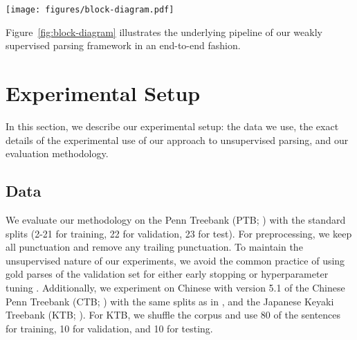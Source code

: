 \documentclass[11pt]{article}
\newcommand{\ptb}{\textsc{PTB}}
\newcommand{\ctb}{\textsc{CTB}}
\newcommand{\ktb}{\textsc{KTB}}
\begin{document}
\begin{figure*}[t]
    \centering
     \texttt{[image: figures/block-diagram.pdf]}
    \caption[Block diagram detailing our approach]{Block diagram detailing our approach. We perform the self-training procedure for five iterations which follow multiple steps; \textbf{(I)}: Fine-tune a RoBERTa\textsubscript{\textsc{Base}} model (teacher) on a downstream task using a cross-entropy loss after seed bootstrapping; \textbf{(II)}: Synthetically annotate this data using the teacher model and select top K samples corresponding to each class to form the final synthetic dataset; We fine-tune a RoBERTa\textsubscript{\textsc{Base}} model (student) on this dataset using hard labels and retrieve the outside strings from the most confident insides; \textbf{(III)}: Train the outside classifier on these outside strings;  We perform the co-training procedure for two iterations which follow a two-fold optimizing step; \textbf{(IV)}: Retrieve the inside strings from the most confident outsides and train the inside classifier; \textbf{(V)}: Retrieve the outside strings from the most confident insides and train the outside classifier.}
    \label{fig:block-diagram}
\end{figure*}


Figure~\ref{fig:block-diagram} illustrates the underlying pipeline of our weakly supervised parsing framework in an end-to-end fashion.
 \section{Experimental Setup}
\label{sec:experiments}

In this section, we describe our experimental setup: the data we use, the exact details of the experimental use of our approach to unsupervised parsing, and our evaluation methodology.

\subsection{Data}
\label{ssec:data}
We evaluate our methodology on the Penn Treebank (\ptb{}; \citealt{marcus-etal-1993-building}) with the standard splits (2-21 for training, 22 for validation, 23 for test). For preprocessing, we keep all punctuation and remove any trailing punctuation. To maintain the unsupervised nature of our experiments, we avoid the common practice of using gold parses of the validation set for either early stopping \citep{shen2018neural, shen2018ordered, drozdov-etal-2019-unsupervised} or hyperparameter tuning \citep{kim-etal-2019-compound}. Additionally, we experiment on Chinese with version 5.1 of the Chinese Penn Treebank (\ctb{}; \citealt{DBLP:journals/nle/XueXCP05}) with the same splits as in \citet{chen-manning-2014-fast}, and the Japanese Keyaki Treebank (\ktb{}; \citealt{butlerkeyaki}). For \ktb, we shuffle the corpus and use 80 of the sentences for training, 10 for validation, and 10 for testing.
\end{document}
